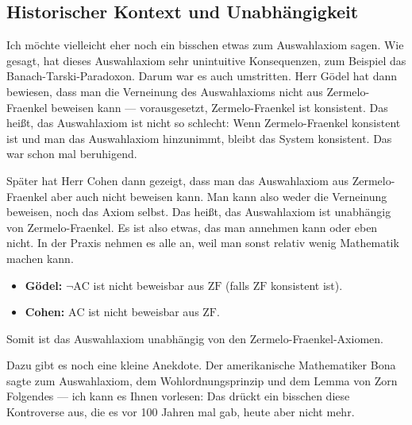 \subsection{Historischer Kontext und Unabhängigkeit}

\begin{spoken-clean}[01:04:40 - 01:06:40]
Ich möchte vielleicht eher noch ein bisschen etwas zum Auswahlaxiom sagen. Wie gesagt, hat dieses Auswahlaxiom sehr unintuitive Konsequenzen, zum Beispiel das Banach-Tarski-Paradoxon. Darum war es auch umstritten. Herr Gödel hat dann bewiesen, dass man die Verneinung des Auswahlaxioms nicht aus Zermelo-Fraenkel beweisen kann --- vorausgesetzt, Zermelo-Fraenkel ist konsistent. Das heißt, das Auswahlaxiom ist nicht so schlecht: Wenn Zermelo-Fraenkel konsistent ist und man das Auswahlaxiom hinzunimmt, bleibt das System konsistent. Das war schon mal beruhigend.

Später hat Herr Cohen dann gezeigt, dass man das Auswahlaxiom aus Zermelo-Fraenkel aber auch nicht beweisen kann. Man kann also weder die Verneinung beweisen, noch das Axiom selbst. Das heißt, das Auswahlaxiom ist unabhängig von Zermelo-Fraenkel. Es ist also etwas, das man annehmen kann oder eben nicht. In der Praxis nehmen es alle an, weil man sonst relativ wenig Mathematik machen kann.
\end{spoken-clean}

\begin{math-stroke}
\begin{remark}
\begin{itemize}
    \item \textbf{Gödel:} $\neg \text{AC}$ ist nicht beweisbar aus $\text{ZF}$ (falls $\text{ZF}$ konsistent ist).
    \item \textbf{Cohen:} $\text{AC}$ ist nicht beweisbar aus $\text{ZF}$.
\end{itemize}
Somit ist das Auswahlaxiom unabhängig von den Zermelo-Fraenkel-Axiomen.
\end{remark}
\end{math-stroke}

\begin{spoken-clean}[01:06:40 - 01:08:40]
Dazu gibt es noch eine kleine Anekdote. Der amerikanische Mathematiker Bona sagte zum Auswahlaxiom, dem Wohlordnungsprinzip und dem Lemma von Zorn Folgendes --- ich kann es Ihnen vorlesen:  Das drückt ein bisschen diese Kontroverse aus, die es vor 100 Jahren mal gab, heute aber nicht mehr.
\end{spoken-clean}

